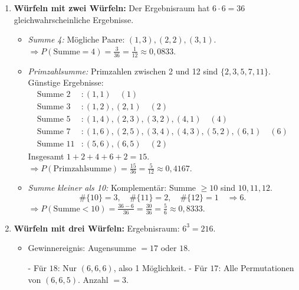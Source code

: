 \documentclass[11pt,a4paper,oneside]{article}
\begin{document}
	
	\begin{loesung}
		
		\begin{enumerate}
			\item \textbf{Würfeln mit zwei Würfeln:}  
			Der Ergebnisraum hat $6 \cdot 6 = 36$ gleichwahrscheinliche Ergebnisse.  
			
			\begin{itemize}
				\item \emph{Summe 4:}  
				Mögliche Paare: $(1,3),(2,2),(3,1)$.  
				$\Rightarrow P(\text{Summe}=4) = \tfrac{3}{36} = \tfrac{1}{12} \approx 0{,}0833$.  
				
				\item \emph{Primzahlsumme:}  
				Primzahlen zwischen 2 und 12 sind $\{2,3,5,7,11\}$.  
				Günstige Ergebnisse:  
				\begin{align*}
					\text{Summe } 2 &: (1,1) \quad (1) \\
					\text{Summe } 3 &: (1,2),(2,1) \quad (2) \\
					\text{Summe } 5 &: (1,4),(2,3),(3,2),(4,1) \quad (4) \\
					\text{Summe } 7 &: (1,6),(2,5),(3,4),(4,3),(5,2),(6,1) \quad (6) \\
					\text{Summe } 11&: (5,6),(6,5) \quad (2) 
				\end{align*}
				Insgesamt $1+2+4+6+2=15$.  
				$\Rightarrow P(\text{Primzahlsumme}) = \tfrac{15}{36} = \tfrac{5}{12} \approx 0{,}4167$.  
				
				\item \emph{Summe kleiner als 10:}  
				Komplementär: Summe $\geq 10$ sind $10,11,12$.  
				\[
				\#\{10\}=3,\quad \#\{11\}=2,\quad \#\{12\}=1 \quad \Rightarrow 6.
				\]  
				$\Rightarrow P(\text{Summe}<10) = \tfrac{36-6}{36} = \tfrac{30}{36} = \tfrac{5}{6} \approx 0{,}8333$.  
			\end{itemize}
			
			\item \textbf{Würfeln mit drei Würfeln:}  
			Ergebnisraum: $6^3 = 216$.
			
			\begin{itemize}
				\item Gewinnereignis: Augensumme $=17$ oder $18$.  
				
				- Für $18$: Nur $(6,6,6)$, also 1 Möglichkeit.  
				- Für $17$: Alle Permutationen von $(6,6,5)$. Anzahl $=3$.  
				

\end{itemize}
\end{enumerate}
\end{loesung}
\end{document}
